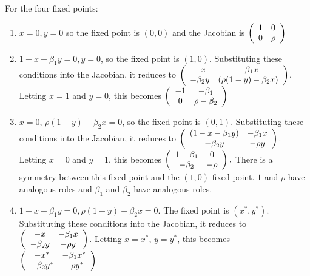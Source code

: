 \documentclass[12pt,letterpaper,answers]{exam}
\begin{document}
\begin{questions}
\begin{parts}
\begin{solution}
For the four fixed points:
\begin{enumerate}
\item $x = 0, y = 0$ so the fixed point is $(0,0)$ and the Jacobian is $\left(\begin{array}{c c} 1 & 0 \\ 0 & \rho  \end{array}\right) $
\item  $1 - x - \beta_1 y = 0, y = 0$, so the fixed point is $(1,0)$.  Substituting these conditions into the Jacobian, it reduces to $\left(\begin{array}{c c}  - x & -\beta_1 x \\ -\beta_2 y & (\rho(1-y) - \beta_2 x)  \end{array}\right)$.  Letting $x = 1$ and $y = 0$, this becomes $\left(\begin{array}{c c}  -1 & -\beta_1 \\ 0 & \rho - \beta_2  \end{array}\right)$
\item   $x = 0$, $\rho(1-y)-\beta_2 x = 0$, so the fixed point is $(0,1)$. Substituting these conditions into the Jacobian, it reduces to $\left(\begin{array}{c c} (1-x-\beta_1 y) & -\beta_1 x \\ -\beta_2 y & - \rho y  \end{array}\right) $.  Letting $x =0$ and $y=1$, this becomes $\left(\begin{array}{c c} 1-\beta_1 & 0 \\ -\beta_2 & - \rho   \end{array}\right).$  There is a symmetry between this fixed point and the $(1,0)$ fixed point.  $1$ and $\rho$ have analogous roles and $\beta_1$ and $\beta_2$ have analogous roles.

\item  $1-x-\beta_1 y = 0, \rho(1-y) - \beta_2 x = 0$.  The fixed point is $(x^*, y^*)$.  Substituting these conditions into the Jacobian, it reduces to $\left(\begin{array}{c c}  - x & -\beta_1 x \\ -\beta_2 y & - \rho y  \end{array}\right) $.  Letting $x=x^*$, $y=y^*$, this becomes $\left(\begin{array}{c c}  - x^* & -\beta_1 x^* \\ -\beta_2 y^* & - \rho y^*  \end{array}\right) $
\end{enumerate}


\end{solution}
\end{parts}
\end{questions}
\end{document}
